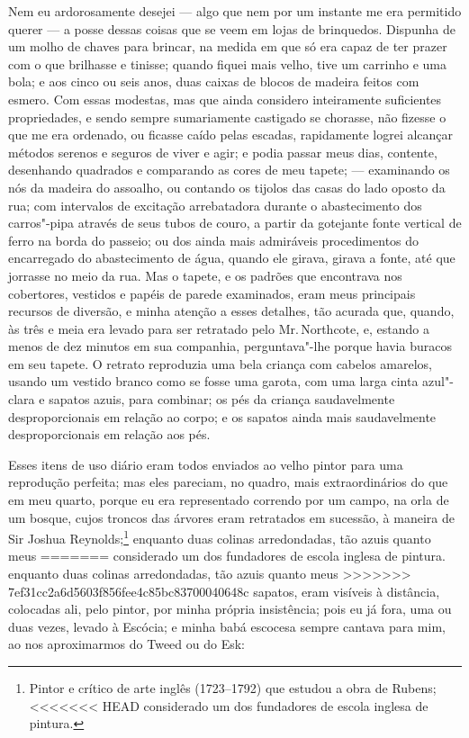{{{{{{{{{{{%
Nem eu ardorosamente desejei --- algo que nem por um instante me era
permitido querer --- a posse dessas coisas que se veem em lojas de
brinquedos. Dispunha de um molho de chaves para brincar, na medida em
que só era capaz de ter prazer com o que brilhasse e tinisse; quando
fiquei mais velho, tive um carrinho e uma bola; e aos cinco ou seis
anos, duas caixas de blocos de madeira feitos com esmero. Com essas
modestas, mas que ainda considero inteiramente suficientes propriedades,
e sendo sempre sumariamente castigado se chorasse, não fizesse o que me
era ordenado, ou ficasse caído pelas escadas, rapidamente logrei
alcançar métodos serenos e seguros de viver e agir; e podia passar meus
dias, contente, desenhando quadrados e comparando as cores de meu
tapete; --- examinando os nós da madeira do assoalho, ou contando os
tijolos das casas do lado oposto da rua; com intervalos de excitação
arrebatadora durante o abastecimento dos carros"-pipa através de seus
tubos de couro, a partir da gotejante fonte vertical de ferro na borda
do passeio; ou dos ainda mais admiráveis procedimentos do encarregado do
abastecimento de água, quando ele girava, girava a fonte, até que
jorrasse no meio da rua. Mas o tapete, e os padrões que encontrava nos
cobertores, vestidos e papéis de parede examinados, eram meus principais
recursos de diversão, e minha atenção a esses detalhes, tão acurada que,
quando, às três e meia era levado para ser retratado pelo Mr.\,Northcote,
e, estando a menos de dez minutos em sua companhia, perguntava"-lhe
porque havia buracos em seu tapete. O retrato reproduzia uma bela
criança com cabelos amarelos, usando um vestido branco como se fosse uma
garota, com uma larga cinta azul"-clara e sapatos azuis, para combinar;
os pés da criança saudavelmente desproporcionais em relação ao corpo; e
os sapatos ainda mais saudavelmente desproporcionais em relação aos pés.

Esses itens de uso diário eram todos enviados ao velho pintor para
uma reprodução perfeita; mas eles pareciam, no quadro, mais
extraordinários do que em meu quarto, porque eu era representado
correndo por um campo, na orla de um bosque, cujos troncos das árvores
eram retratados em sucessão, à maneira de Sir Joshua Reynolds;\footnote{Pintor
  e crítico de arte inglês (1723--1792) que estudou a obra de Rubens;
<<<<<<< HEAD
  considerado um dos fundadores de escola inglesa de pintura.} enquanto duas colinas arredondadas, tão azuis quanto meus
=======
  considerado um dos fundadores de escola inglesa de pintura.  enquanto duas colinas arredondadas, tão azuis quanto meus
>>>>>>> 7ef31cc2a6d5603f856fee4c85bc83700040648c
sapatos, eram visíveis à distância, colocadas ali, pelo pintor, por
minha própria insistência; pois eu já fora, uma ou duas vezes, levado à
Escócia; e minha babá escocesa sempre cantava para mim, ao nos
aproximarmos do Tweed ou do Esk:
\bigskip

}}}}}}}}}}}
